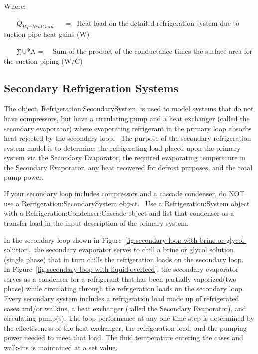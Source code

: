 Where:

~~~ \({\dot Q_{PipeHeatGain}}\) ~~ = ~Heat load on the detailed refrigeration system due to suction pipe heat gains (W)

~~~ ∑U*A = ~~Sum of the product of the conductance times the surface area for the suction piping (W/C)

\subsection{Secondary Refrigeration Systems}\label{secondary-refrigeration-systems}

The object, Refrigeration:SecondarySystem, is used to model systems that do not have compressors, but have a circulating pump and a heat exchanger (called the secondary evaporator) where evaporating refrigerant in the primary loop absorbs heat rejected by the secondary loop.~ The purpose of the secondary refrigeration system model is to determine: the refrigerating load placed upon the primary system via the Secondary Evaporator, the required evaporating temperature in the Secondary Evaporator, any heat recovered for defrost purposes, and the total pump power.

If your secondary loop includes compressors and a cascade condenser, do NOT use a Refrigeration:SecondarySystem object.~ Use a Refrigeration:System object with a Refrigeration:Condenser:Cascade object and list that condenser as a transfer load in the input description of the primary system.

In the secondary loop shown in Figure~\ref{fig:secondary-loop-with-brine-or-glycol-solution}, the secondary evaporator serves to chill a brine or glycol solution (single phase) that in turn chills the refrigeration loads on the secondary loop.~ In Figure~\ref{fig:secondary-loop-with-liquid-overfeed}, the secondary evaporator serves as a condenser for a refrigerant that has been partially vaporized(two-phase) while circulating through the refrigeration loads on the secondary loop. Every secondary system includes a refrigeration load made up of refrigerated cases and/or walkins, a heat exchanger (called the Secondary Evaporator), and circulating pump(s). The loop performance at any one time step is determined by the effectiveness of the heat exchanger, the refrigeration load, and the pumping power needed to meet that load. The fluid temperature entering the cases and walk-ins is maintained at a set value.


